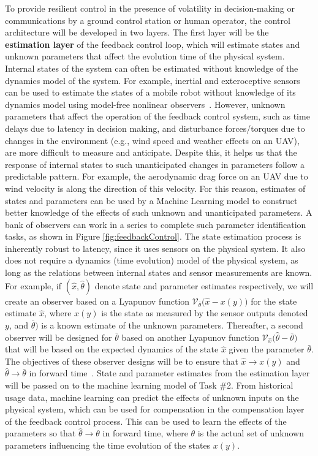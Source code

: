 \documentclass[11pt]{proposalnsf}
\newlength\q %
\begin{document}
\begin{sloppypar}
To provide resilient control in the presence of volatility in decision-making or communications by a ground control station or human operator, the control architecture will be developed in two layers. The first layer will be the {\bf estimation layer} of the feedback control loop, which will estimate states and unknown parameters that affect the evolution time of the physical system. Internal states of the system can often be estimated without knowledge of the dynamics model of the system. For example, inertial and exteroceptive sensors can be used to estimate the states of a mobile robot without knowledge of its dynamics model using model-free nonlinear observers~\cite{auto14,relmoSE3cdc15,auto16}. However, unknown parameters that affect the operation of the feedback control system, such as time delays due to latency in decision making, and disturbance forces/torques due to changes in the environment (e.g., wind speed and weather effects on an UAV), are more difficult to measure and anticipate. Despite this, it helps us that the response of internal states to such unanticipated changes in parameters follow a predictable pattern. For example, the aerodynamic drag force on an UAV due to wind velocity is along the direction of this velocity. For this reason, estimates of states and parameters can be used by a Machine Learning model to construct better knowledge of the effects of such unknown and unanticipated parameters. A bank of observers can work in a series to complete such parameter identification tasks, as shown in Figure \ref{fig:feedbackControl}. The state estimation process is inherently robust to latency, since it uses sensors on the physical system. It also does not require a dynamics (time evolution) model of the physical system, as long as the relations between internal states and sensor measurements are known. For example, if $(\hat{x}, \hat{\theta})$ denote state and parameter estimates respectively, we will create an observer based on a Lyapunov function $\mathcal{V}_{\bar\theta}\big(\hat{x}-x(y)\big)$ for the state estimate $\hat x$, where $x (y)$ is the state as measured by the sensor outputs denoted $y$, and $\bar{\theta})$ is a known estimate of the unknown parameters. Thereafter, a second observer will be designed for $\bar\theta$ based on another Lyapunov function $\mathcal{V}_{\hat x}\big(\hat\theta-\bar\theta\big)$ that will be based on the expected dynamics of the state $\hat x$ given the parameter $\bar\theta$. The objectives of these observer designs will be to ensure that $\hat x \to x(y)$ and $\hat\theta \to\bar\theta$ in forward time~\cite{relmoSE3cdc15, miss16}. State and parameter estimates from the estimation layer will be passed on to the machine learning model of Task \#2. From historical usage data, machine learning can predict the effects of unknown inputs on the physical system, which can be used for compensation in the compensation layer of the feedback control process. This can be used to learn the effects of the parameters so that $\hat\theta\to\theta$ in forward time, where $\theta$ is the actual set of unknown parameters influencing the time evolution of the states $x(y)$.   


\end{sloppypar}
\end{document}
